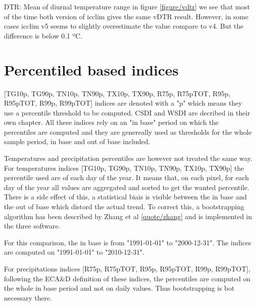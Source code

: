 \documentclass[a4paper,11pt]{article}
\begin{document}
    DTR: Mean of diurnal temperature range
    in figure \ref{figure/vdtr} we see that most of the time both version of icclim gives the same vDTR result.
    However, in some cases icclim v5 seems to slightly overestimate the value compare to v4. But the difference is below 0.1 ºC.

\section{Percentiled based indices}
    [TG10p, TG90p, TN10p, TN90p, TX10p, TX90p, R75p, R75pTOT, R95p, R95pTOT, R99p, R99pTOT] indices are denoted with a "p" which means they use a percentile threshold to be computed. CSDI and WSDI are decribed in their own chapter.
    All these indices rely on an "in base" period on which the percentiles are computed and they are genereally used as thresholds for the whole sample period, in base and out of base included.

    Temperatures and precipitation percentiles are however not treated the same way. 
    For temperatures indices [TG10p, TG90p, TN10p, TN90p, TX10p, TX90p] the percentile used are of each day of the year. It means that, on each pixel, for each day of the year all values are aggregated and sorted to get the wanted percentile. 
    There is a side effect of this, a statistical biais is visible between the in base and the out of base which distord the actual trend.
    To correct this, a bootstrapping algorithm has been described by Zhang et al \ref{quote/zhang} and is implemented in the three software.

    For this comparison, the in base is from "1991-01-01" to "2000-12-31".
    The indices are computed on "1991-01-01" to "2010-12-31".

    For precipitations indices [R75p, R75pTOT, R95p, R95pTOT, R99p, R99pTOT], following the ECA\&D definition of these indices, the percentiles are computed on the whole in base period and not on daily values. Thus bootstrapping is bot necessary there.
\end{document}
